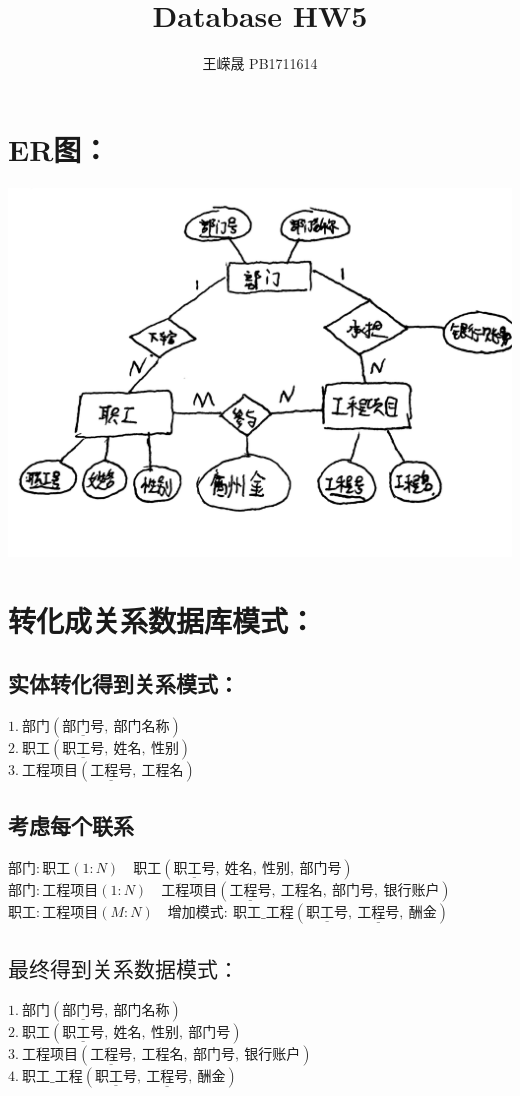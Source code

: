 \documentclass{article}
\title{Database HW5}
\author{王嵘晟 \quad PB1711614}
\date{}
\begin{document}
	\maketitle
	\section*{ER图：}
	\includegraphics[scale=0.13]{2.jpg}\\
	\section*{转化成关系数据库模式：}
	\subsection*{实体转化得到关系模式：}
	$1.\ 部门(\underline{部门号},\ 部门名称)$\\
	$2.\ 职工(\underline{职工号},\ 姓名,\ 性别)$\\
	$3.\ 工程项目(\underline{工程号},\ 工程名) $
	\subsection*{考虑每个联系}
	$部门:职工(1:N)\quad 职工(\underline{职工号},\ 姓名,\ 性别,\ 部门号)$\\
	$部门:工程项目(1:N)\quad 工程项目(\underline{工程号},\ 工程名,\ 部门号,\ 银行账户)$\\
	$职工:工程项目(M:N)\quad 增加模式:\ 职工\_ 工程(\underline{职工号},\ \underline{工程号},\ 酬金)$
	\subsection*{$\textbf{最终得到关系数据模式：}$}
	$1.\ 部门(\underline{部门号},\ 部门名称)$\\
	$2.\ 职工(\underline{职工号},\ 姓名,\ 性别,\ 部门号)$\\ 
	$3.\ 工程项目(\underline{工程号},\ 工程名,\ 部门号,\ 银行账户)$\\
	$4.\ 职工\_ 工程(\underline{职工号},\ \underline{工程号},\ 酬金)$
\end{document}
